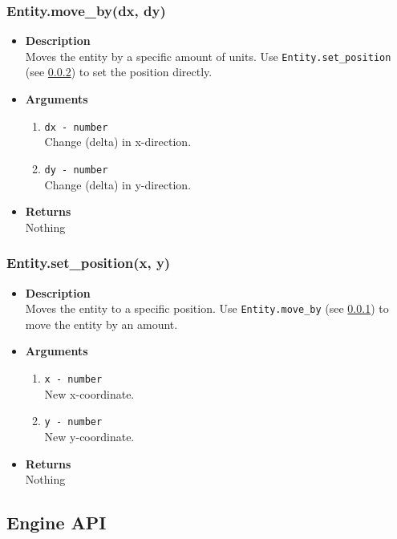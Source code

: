 \documentclass[12pt,a4paper]{article}
\begin{document}
\subsubsection{Entity.move\_by(dx, dy)}\label{EntityMoveBy}
\begin{itemize}
	\item[]{\bf Description}
		\\ Moves the entity by a specific amount of units. Use \texttt{Entity.set\_position} (see \ref{EntitySetPosition}) to set the position directly.
	\item[]{\bf Arguments}
		\begin{enumerate}
			\item{\texttt{dx - number}} 
				\\ Change (delta) in x-direction.
			\item{\texttt{dy - number}} 
				\\ Change (delta) in y-direction.				
		\end{enumerate}
	\item[]{\bf Returns}
		\\ Nothing
\end{itemize}

\subsubsection{Entity.set\_position(x, y)}\label{EntitySetPosition}
\begin{itemize}
	\item[]{\bf Description}
		\\ Moves the entity to a specific position. Use \texttt{Entity.move\_by} (see \ref{EntityMoveBy}) to move the entity by an amount.
	\item[]{\bf Arguments}
		\begin{enumerate}
			\item{\texttt{x - number}} 
				\\ New x-coordinate.
			\item{\texttt{y - number}} 
				\\ New y-coordinate.
		\end{enumerate}
	\item[]{\bf Returns}
		\\ Nothing
\end{itemize}

\subsection{Engine API}
\end{document}
